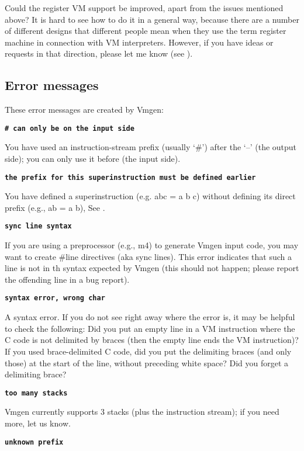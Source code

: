 \documentclass[10pt,english]{article}
\begin{document}
Could the register VM support be improved, apart from the issues mentioned
above? It is hard to see how to do it in a general way, because there
are a number of different designs that different people mean when
they use the term register machine in connection with VM interpreters.
However, if you have ideas or requests in that direction, please let
me know (see ).


\subsection{Error messages}

These error messages are created by Vmgen:

\texttt{\textbf{\# can only be on the input side}}

You have used an instruction-stream prefix (usually \textquoteleft{}\#\textquoteright{})
after the \textquoteleft{}--\textquoteright{} (the output side); you
can only use it before (the input side).

\texttt{\textbf{the prefix for this superinstruction must be defined
earlier}}

You have defined a superinstruction (e.g. abc = a b c) without defining
its direct prefix (e.g., ab = a b), See .

\texttt{\textbf{sync line syntax}}

If you are using a preprocessor (e.g., m4) to generate Vmgen input
code, you may want to create \#line directives (aka sync lines). This
error indicates that such a line is not in th syntax expected by Vmgen
(this should not happen; please report the offending line in a bug
report).

\texttt{\textbf{syntax error, wrong char}}

A syntax error. If you do not see right away where the error is, it
may be helpful to check the following: Did you put an empty line in
a VM instruction where the C code is not delimited by braces (then
the empty line ends the VM instruction)? If you used brace-delimited
C code, did you put the delimiting braces (and only those) at the
start of the line, without preceding white space? Did you forget a
delimiting brace?

\texttt{\textbf{too many stacks}}

Vmgen currently supports 3 stacks (plus the instruction stream); if
you need more, let us know.

\texttt{\textbf{unknown prefix}}
\end{document}
